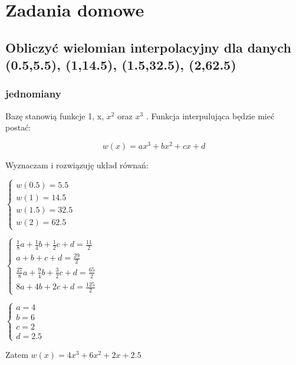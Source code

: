 \documentclass[5]{article}
\begin{document}
\section{Zadania domowe}

\subsection{Obliczyć wielomian interpolacyjny dla danych (0.5,5.5), (1,14.5), (1.5,32.5), (2,62.5)}

\subsubsection{jednomiany}


Bazę stanowią funkcje 1, x, $x^2$ oraz $x^3$ . Funkcja interpulująca będzie mieć postać:

\[w(x) = ax^3+bx^2+cx+d\]

\begin{flushleft}
Wyznaczam i rozwiązuję układ równań:
\end{flushleft}

\begin{flushleft}
$
\left\{ \begin{array}{ll}
w(0.5)=5.5\\
w(1)=14.5\\
w(1.5) = 32.5\\
w(2) = 62.5
\end{array} \right.
$
\end{flushleft}
\begin{flushleft}
$
\left\{ \begin{array}{ll}
\frac{1}{8}a+\frac{1}{4}b+\frac{1}{2}c+d=\frac{11}{2}\\
a+b+c+d=\frac{29}{2}\\
\frac{27}{8}a+\frac{9}{4}b+\frac{3}{2}c+d=\frac{65}{2}\\
8a+4b+2c+d=\frac{125}{2}
\end{array} \right.
$
\end{flushleft}

\begin{flushleft}
$
\left\{ \begin{array}{ll}
a=4\\
b=6\\
c=2\\
d=2.5
\end{array} \right.
$
\end{flushleft}

\begin{flushleft}
Zatem $w(x)=4x^3+6x^2+2x+2.5$
\end{flushleft}
\end{document}
